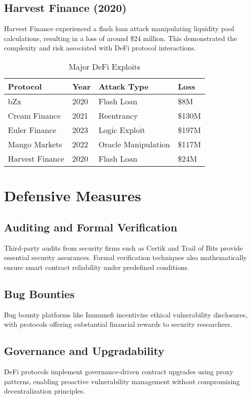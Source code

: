 \documentclass[conference]{IEEEtran}
\begin{document}
\subsection{Harvest Finance (2020)}
Harvest Finance experienced a flash loan attack manipulating liquidity pool calculations, resulting in a loss of around \$24 million. This demonstrated the complexity and risk associated with DeFi protocol interactions.

\begin{table}[htbp]
\caption{Major DeFi Exploits}
\centering
\begin{tabular}{@{}llll@{}}
\toprule
\textbf{Protocol} & \textbf{Year} & \textbf{Attack Type} & \textbf{Loss} \\
\midrule
bZx & 2020 & Flash Loan & \$8M \\
Cream Finance & 2021 & Reentrancy & \$130M \\
Euler Finance & 2023 & Logic Exploit & \$197M \\
Mango Markets & 2022 & Oracle Manipulation & \$117M \\
Harvest Finance & 2020 & Flash Loan & \$24M \\
\bottomrule
\end{tabular}
\end{table}

\section{Defensive Measures}

\subsection{Auditing and Formal Verification}
Third-party audits from security firms such as Certik and Trail of Bits provide essential security assurances. Formal verification techniques also mathematically ensure smart contract reliability under predefined conditions.

\subsection{Bug Bounties}
Bug bounty platforms like Immunefi incentivize ethical vulnerability disclosures, with protocols offering substantial financial rewards to security researchers.

\subsection{Governance and Upgradability}
DeFi protocols implement governance-driven contract upgrades using proxy patterns, enabling proactive vulnerability management without compromising decentralization principles.
\end{document}

